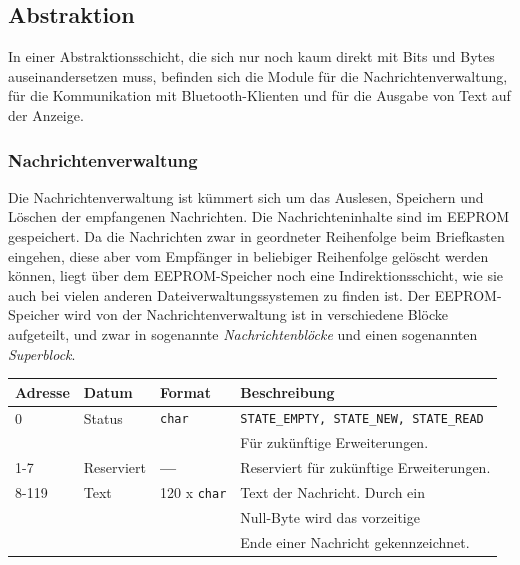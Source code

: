 \documentclass[ngerman]{article}
\begin{document}
\subsection{Abstraktion}

In einer Abstraktionsschicht, die sich nur noch kaum direkt mit Bits und Bytes
auseinandersetzen muss, befinden sich die Module für die
Nachrichtenverwaltung, für die Kommunikation mit Bluetooth-Klienten
und für die Ausgabe von Text auf der Anzeige.


\subsubsection{Nachrichtenverwaltung}

Die Nachrichtenverwaltung ist kümmert sich um das Auslesen, Speichern und Löschen
der empfangenen Nachrichten. Die Nachrichteninhalte sind im EEPROM gespeichert.
Da die Nachrichten zwar in geordneter Reihenfolge beim Briefkasten eingehen, diese aber
vom Empfänger in beliebiger Reihenfolge gelöscht werden können, liegt über dem
EEPROM-Speicher noch eine In\-di\-rek\-tions\-schicht, wie sie auch bei vielen anderen
Dateiverwaltungssystemen zu finden ist. Der EEPROM-Speicher wird von der
Nachrichtenverwaltung ist in verschiedene Blöcke aufgeteilt, und zwar in
sogenannte \textit{Nachrichtenblöcke} und einen sogenannten
\textit{Superblock}.


\begin{tabular}{|l|l|l|l|}
    \hline
    {\bf Adresse} & {\bf Datum} & {\bf Format} & {\bf Beschreibung} \\
    \hline
    \hline
    0 & Status & {\tt char} & {\tt STATE\_EMPTY, STATE\_NEW,  STATE\_READ} \\
                          &&& Für zukünftige Erweiterungen. \\
    \hline
    1-7 & Reserviert & {\bf --- }  & Reserviert für zukünftige Erweiterungen. \\
    \hline
    8-119 & Text & 120 x {\tt char} & Text der Nachricht. Durch ein \\
                                  &&& Null-Byte wird das vorzeitige \\
                                  &&& Ende einer Nachricht gekennzeichnet. \\
    \hline
\end{tabular}
\end{document}
